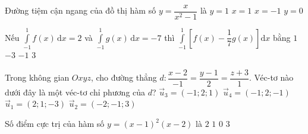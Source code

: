 \begin{ex}%
	Đường tiệm cận ngang của đồ thị hàm số $y=\dfrac{x}{x^2-1}$ là
	\choice
	{$y=1$}
	{$x=1$}
	{$x=-1$}
	{\True $y=0$}
\end{ex}

\begin{ex}%
	Nếu $\displaystyle\int\limits_{-1}^1f(x)\mathrm{\,d}x=2$ và $\displaystyle\int\limits_{-1}^1g(x)\mathrm{\,d}x=-7$ thì $\displaystyle\int\limits_{-1}^1\left[f(x)-\dfrac{1}{7}g(x)\right]\mathrm{d}x$ bằng
	\choice
	{$1$}
	{$-3$}
	{$-1$}
	{\True $3$}
\end{ex}

\begin{ex}%
	Trong không gian $Oxyz$, cho đường thẳng $d\colon\dfrac{x-2}{-1}=\dfrac{y-1}{2}=\dfrac{z+3}{1}$. Véc-tơ nào dưới đây là một véc-tơ chỉ phương của $d$?
	\choice
	{\True $\overrightarrow{u}_3=\left(-1;2;1\right)$}
	{$\overrightarrow{u}_4=\left(-1;2;-1\right)$}
	{$\overrightarrow{u}_1=\left(2;1;-3\right)$}
	{$\overrightarrow{u}_2=\left(-2;-1;3\right)$}
\end{ex}

\begin{ex}%
	Số điểm cực trị của hàm số $y=(x-1)^2 (x-2)$ là
	\choice
	{\True $2$}
	{$1$}
	{$0$}
	{$3$}
\end{ex}

